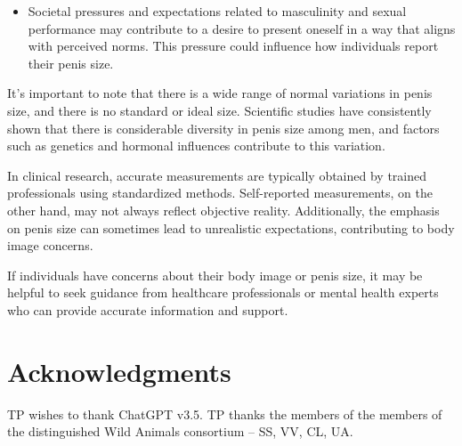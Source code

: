 \documentclass[
  10pt,
  letterpaper,
]{article}
\providecommand{\tightlist}{%
  \setlength{\itemsep}{0pt}\setlength{\parskip}{0pt}}\usepackage{longtable,booktabs,array}
\begin{document}
\begin{enumerate}
  \begin{itemize}
  \tightlist
  \item
    Societal pressures and expectations related to masculinity and
    sexual performance may contribute to a desire to present oneself in
    a way that aligns with perceived norms. This pressure could
    influence how individuals report their penis size.
  \end{itemize}
\end{enumerate}

It's important to note that there is a wide range of normal variations
in penis size, and there is no standard or ideal size. Scientific
studies have consistently shown that there is considerable diversity in
penis size among men, and factors such as genetics and hormonal
influences contribute to this variation.

In clinical research, accurate measurements are typically obtained by
trained professionals using standardized methods. Self-reported
measurements, on the other hand, may not always reflect objective
reality. Additionally, the emphasis on penis size can sometimes lead to
unrealistic expectations, contributing to body image concerns.

If individuals have concerns about their body image or penis size, it
may be helpful to seek guidance from healthcare professionals or mental
health experts who can provide accurate information and support.

\hypertarget{acknowledgments}{%
\section{Acknowledgments}\label{acknowledgments}}

TP wishes to thank ChatGPT v3.5. TP thanks the members of the members of
the distinguished Wild Animals consortium -- SS, VV, CL, UA.


\nolinenumbers
  
\end{document}
